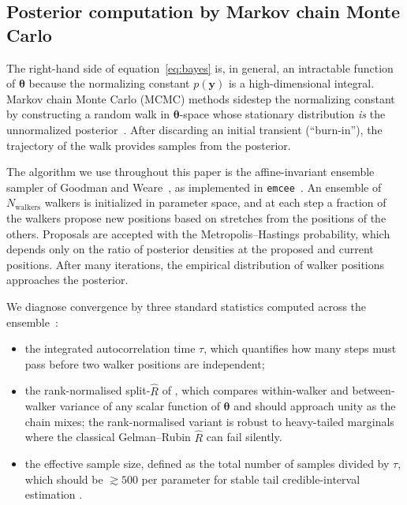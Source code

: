 \documentclass[12pt]{article}
\theoremstyle{plain}
\theoremstyle{definition}
\theoremstyle{remark}
\begin{document}
\subsection{Posterior computation by Markov chain Monte Carlo}\label{sec:bg:mcmc}

The right-hand side of equation~\eqref{eq:bayes} is, in general, an
intractable function of $\boldsymbol{\theta}$ because the normalizing
constant $p(\mathbf{y})$ is a high-dimensional integral.  Markov chain Monte
Carlo (MCMC) methods sidestep the normalizing constant by constructing a
random walk in $\boldsymbol{\theta}$-space whose stationary distribution
\emph{is} the unnormalized posterior~\citep{Tierney1994,vdVaart1998}.  After
discarding an initial transient (``burn-in''), the trajectory of the walk
provides samples from the posterior.

The algorithm we use throughout this paper is the affine-invariant ensemble
sampler of Goodman and Weare~\citep{GoodmanWeare2010}, as implemented in
\texttt{emcee}~\citep{ForemanMackey2013}.  An ensemble of $N_{\mathrm{walkers}}$
walkers is initialized in parameter space, and at each step a fraction of the
walkers propose new positions based on stretches from the positions of the
others.  Proposals are accepted with the Metropolis--Hastings probability,
which depends only on the ratio of posterior densities at the proposed and
current positions.  After many iterations, the empirical distribution of
walker positions approaches the posterior.

We diagnose convergence by three standard statistics computed across the
ensemble~\citep{Vehtari2017,Vehtari2021}:
\begin{itemize}
\item the integrated autocorrelation time $\tau$, which quantifies how many
steps must pass before two walker positions are independent;
\item the rank-normalised split-$\widehat{R}$ of \citet{Vehtari2021}, which
compares within-walker and between-walker variance of any scalar function
of $\boldsymbol{\theta}$ and should approach unity as the chain mixes;
the rank-normalised variant is robust to heavy-tailed marginals where the
classical Gelman--Rubin $\widehat R$ can fail silently.
\item the effective sample size, defined as the total number of samples
divided by $\tau$, which should be $\gtrsim 500$ per parameter for stable
tail credible-interval estimation \citep{Vehtari2021}.
\end{itemize}
\end{document}
